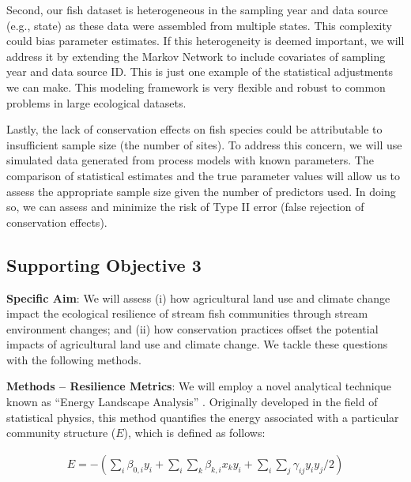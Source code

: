 \documentclass[12pt, class=article, crop=false]{standalone}
\begin{document}
Second, our fish dataset is heterogeneous in the sampling year and data source (e.g., state) as these data were assembled from multiple states.
This complexity could bias parameter estimates.
If this heterogeneity is deemed important, we will address it by extending the Markov Network to include covariates of sampling year and data source ID.
This is just one example of the statistical adjustments we can make.
This modeling framework is very flexible and robust to common problems in large ecological datasets.

Lastly, the lack of conservation effects on fish species could be attributable to insufficient sample size (the number of sites).
To address this concern, we will use simulated data generated from process models with known parameters.
The comparison of statistical estimates and the true parameter values will allow us to assess the appropriate sample size given the number of predictors used.
In doing so, we can assess and minimize the risk of Type II error (false rejection of conservation effects).

\subsection{Supporting Objective 3}

\textbf{Specific Aim}: We will assess (i) how agricultural land use and climate change impact the ecological resilience of stream fish communities through stream environment changes; and (ii) how conservation practices offset the potential impacts of agricultural land use and climate change.
We tackle these questions with the following methods.

\textbf{Methods -- Resilience Metrics}: We will employ a novel analytical technique known as ``Energy Landscape Analysis'' \citep{suzuki_energy_2021}. Originally developed in the field of statistical physics, this method quantifies the energy associated with a particular community structure ($E$), which is defined as follows:

\begin{align}\label{eq:energy}
E = -(\sum_i \beta_{0,i} y_i + \sum_i \sum_k \beta_{k,i} x_{k} y_i + \sum_i \sum_j \gamma_{ij} y_i y_j / 2)
\end{align}
\end{document}
